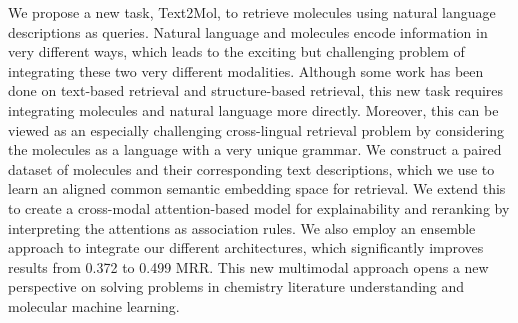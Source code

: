 We propose a new task, Text2Mol, to retrieve molecules using natural language descriptions as queries. Natural language and molecules encode information in very different ways, which leads to the exciting but challenging problem of integrating these two very different modalities. Although some work has been done on text-based retrieval and structure-based retrieval, this new task requires integrating molecules and natural language more directly. Moreover, this can be viewed as an especially challenging cross-lingual retrieval problem by considering the molecules as a language with a very unique grammar. We construct a paired dataset of molecules and their corresponding text descriptions, which we use to learn an aligned common semantic embedding space for retrieval. We extend this to create a cross-modal attention-based model for explainability and reranking by interpreting the attentions as association rules. We also employ an ensemble approach to integrate our different architectures, which significantly improves results from 0.372 to 0.499 MRR. This new multimodal approach opens a new perspective on solving problems in chemistry literature understanding and molecular machine learning.

